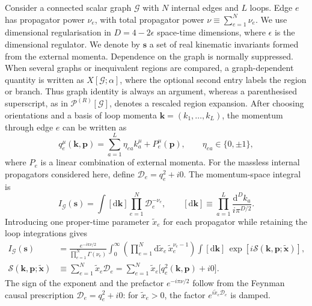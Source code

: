 \documentclass[a4paper,11pt]{article}
\newcommand{\s}{\boldsymbol{s}}
\newcommand{\dd}{\mathrm d}
\begin{document}
Consider a connected scalar graph \(\mathcal G\) with \(N\) internal edges
and \(L\) loops.  Edge \(e\) has propagator power \(\nu_e\), with total
propagator power \(\nu\equiv\sum_{e=1}^{N}\nu_e\).  We use dimensional
regularisation in \(D=4-2\epsilon\) space-time dimensions, where
\(\epsilon\) is the dimensional regulator.  We denote by \(\s\) a set of
real kinematic invariants formed from the external momenta.  Dependence on
the graph is normally suppressed.  When several graphs or inequivalent
regions are compared, a graph-dependent quantity is written as
\(X[\mathcal G;\alpha]\), where the optional second entry labels the
region or branch.  Thus graph identity is always an argument, whereas a
parenthesised superscript, as in \(\mathcal P^{(R)}[\mathcal G]\), denotes a
rescaled region expansion.
After choosing orientations and a basis of loop momenta
\(\boldsymbol k=(k_1,\ldots,k_L)\), the momentum through edge \(e\) can be
written as
\begin{equation}
 q_e^\mu(\boldsymbol k,\boldsymbol p)
 =\sum_{a=1}^{L}\eta_{ea}k_a^\mu+P_e^\mu(\boldsymbol p),
 \qquad \eta_{ea}\in\{0,\pm1\},
 \label{eq:edge-momentum-routing}
\end{equation}
where \(P_e\) is a linear combination of external momenta.  For the massless
internal propagators considered here, define
\(\mathcal D_e=q_e^2+i0\).  The momentum-space integral is
\begin{equation}
 I_{\mathcal G}(\s)
 =\int[\dd\boldsymbol k]\prod_{e=1}^{N}\mathcal D_e^{-\nu_e},
 \qquad
 [\dd\boldsymbol k]
 \equiv\prod_{a=1}^{L}\frac{\dd^D k_a}{i\pi^{D/2}}.
 \label{eq:momentum-integral}
\end{equation}
Introducing one proper-time parameter \(\widetilde x_e\) for each propagator while retaining the
loop integrations gives\footnotemark\ \cite{Weinzierl:2022eaz}
\begin{equation}
\begin{aligned}
 I_{\mathcal G}(\s)
 &=\frac{e^{-i\pi\nu/2}}{\prod_{e=1}^{N}\Gamma(\nu_e)}
 \int_0^\infty\!\left(\prod_{e=1}^{N}
       \dd\widetilde x_e\,\widetilde x_e^{\nu_e-1}\right)
 \int[\dd\boldsymbol k]\,
 \exp\!\left[i\mathcal S
 (\boldsymbol k,\boldsymbol p;\widetilde{\boldsymbol x})\right],\\
 \mathcal S(\boldsymbol k,\boldsymbol p;\widetilde{\boldsymbol x})
 &\equiv\sum_{e=1}^{N}\widetilde x_e\mathcal D_e
 =\sum_{e=1}^{N}\widetilde x_e
       \big[q_e^2(\boldsymbol k,\boldsymbol p)+i0\big].
\end{aligned}
 \label{eq:schwinger-representation}
\end{equation}
The sign of the exponent and the prefactor \(e^{-i\pi\nu/2}\) follow from
the Feynman causal prescription \(\mathcal D_e=q_e^2+i0\): for
\(\widetilde x_e>0\), the factor
\(e^{i\widetilde x_e\mathcal D_e}\) is damped.
\end{document}
